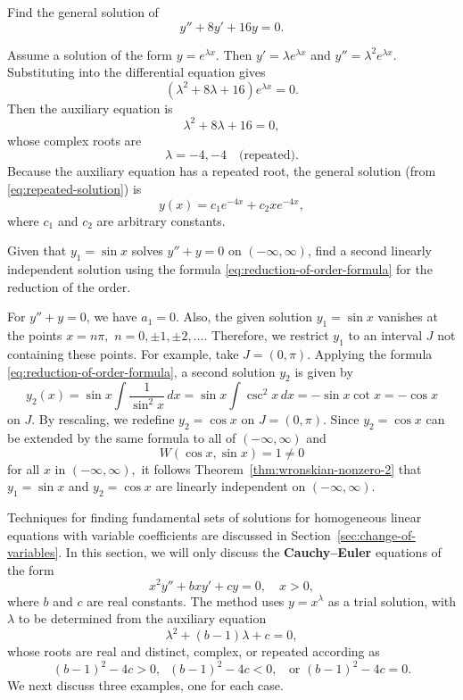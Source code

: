  
 \begin{example}\label{eg:repeated}
 Find the general solution of  $$y''+8y'+16y = 0.$$
 \end{example}
 \begin{solution}
 	Assume a solution of the form $y = e^{\lambda x}$. Then $y' = \lambda e^{\lambda x}$ and $y'' = \lambda^2 e^{\lambda x}$. Substituting into the differential equation gives
 	\[
 	(\lambda^2 + 8\lambda + 16)e^{\lambda x} = 0.
 	\]
 	Then the auxiliary equation is
 	\[\lambda^2 + 8\lambda + 16=0,\]
 	whose complex roots are
 	\[
 	\lambda = -4, -4 \quad \mbox{(repeated).}
 	\]
 	Because the auxiliary equation has a repeated root,  the general solution (from \eqref{eq:repeated-solution}) is
 	\[
 	y(x) = c_1 e^{-4x} + c_2 x e^{-4x},
 	\]  
 	where \(c_1\) and \(c_2\) are arbitrary constants.
 \end{solution}
 
 
 
  \begin{example}\label{eg:order-reduction}
Given that \(y_1 = \sin x\) solves \(y'' + y = 0\) on \((-\infty, \infty)\), find a second linearly independent solution using the formula \eqref{eq:reduction-of-order-formula} for the reduction of the order.
 \end{example}
 \begin{solution} For \(y'' + y = 0\), we have  $a_1 =0.$ Also, the given solution \(y_1 = \sin x\) vanishes at the points $x = n\pi,$ $ n= 0, \pm 1, \pm 2, \dots.$ Therefore, we  restrict $y_1$ to an interval \(J\) not containing these points. For example, take $J = (0, \pi).$
 	Applying the formula \eqref{eq:reduction-of-order-formula}, a second  solution $y_2$  is given by
 	\[y_2(x)  = \sin x \int \frac{1}{\sin^2x}\, dx  = \sin x \int \csc^2 x\, dx= -\sin x \cot x = -\cos x\] on \(J.\)
 	By rescaling, we redefine $y_2 = \cos x$ on \(J=(0, \pi).\) Since $y_2= \cos x$ can be extended by the same formula  to all of $(-\infty, \infty)$ and  \[W(\cos x, \sin x) = 1\ne 0\] for all $x$ in  $(-\infty, \infty),$ it follows Theorem~\ref{thm:wronskian-nonzero-2} that $y_1= \sin x$ and $y_2 = \cos x$ are linearly independent on  $(-\infty, \infty).$
 \end{solution}
 
 Techniques for finding fundamental sets of solutions for  homogeneous linear equations with variable coefficients are discussed in Section~\ref{sec:change-of-variables}.
 In this section, we will only  discuss the \textbf{Cauchy–Euler} equations of the form
 \begin{equation}\label{eq:Cauchy-Euler}
 	x^2y''+b xy' +cy =0,\quad  x>0,
 \end{equation}
 where $b$ and $c$ are real constants. The method uses  \(y = x^\lambda\) as a trial solution, with $\lambda$ to be determined from the auxiliary equation 
 \[\lambda^2 +(b-1)\lambda +c=0,\] whose roots are
  real and distinct, complex, or repeated  according as 
  \[(b-1)^2-4c>0,\;\; (b-1)^2-4c<0,\;\;  \mbox{ or }  (b-1)^2-4c=0. \]
  We next discuss three examples, one for each case.
 

